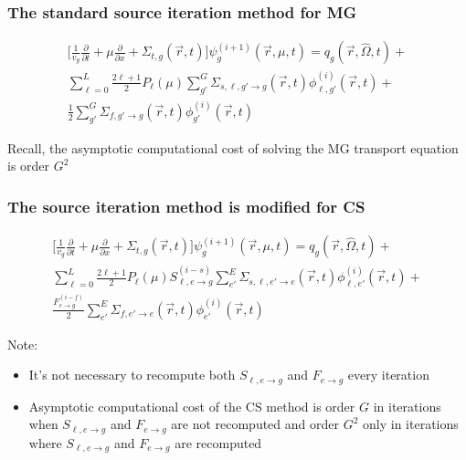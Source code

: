 \documentclass[xcolor=dvipsnames]{beamer}
\newlength{\wideitemsep}
\let\olditem\item
\renewcommand{\item}{\setlength{\itemsep}{\wideitemsep}\olditem}
\begin{document}
\begin{frame}
  \frametitle{The standard source iteration method for MG}

\begin{itemize}
\end{itemize}
\begin{multline*}
\Bigg[\frac{1}{v_g} \frac{\partial}{\partial t} + \mu \frac{\partial}{\partial x} + \Sigma_{t,g}(\vec{r},t) \Bigg] \psi^{(i+1)}_g(\vec{r},\mu,t)  = q_g(\vec{r},\hat{\Omega},t) + \\  \sum_{\ell=0}^L \frac{2 \ell + 1}{2} P_\ell(\mu) \sum_{g'}^G \Sigma_{s,\ell, g' \to g}(\vec{r},t) \phi^{(i)}_{\ell,g'}(\vec{r},t) + \\  \frac{1}{2} \sum_{g'}^G \Sigma_{f,g' \to g}(\vec{r},t) \phi^{(i)}_{g'}(\vec{r},t)
\end{multline*}

\vspace{0.5cm}

Recall, the asymptotic computational cost of solving the MG transport equation is order $G^2$

\end{frame}



\begin{frame}
  \frametitle{The source iteration method is modified for CS}

\begin{multline*}
\Bigg[\frac{1}{v_g} \frac{\partial}{\partial t} + \mu \frac{\partial}{\partial x} + \Sigma_{t,g}(\vec{r},t) \Bigg] \psi^{(i+1)}_g(\vec{r},\mu,t)  = q_g(\vec{r},\hat{\Omega},t) + \\  \sum_{\ell=0}^L \frac{2 \ell + 1}{2} P_\ell(\mu) S_{\ell,e\to g}^{(i-s)} \sum_{e'}^E \Sigma_{s,\ell, e' \to e}(\vec{r},t) \phi^{(i)}_{\ell,e'}(\vec{r},t) + \\  \frac{F_{e \to g}^{(i-f)}}{2} \sum_{e'}^E \Sigma_{f,e' \to e}(\vec{r},t) \phi^{(i)}_{e'}(\vec{r},t)
\end{multline*}

Note:
\begin{itemize}
\item It's not necessary to recompute both $S_{\ell,e\to g}$ and $F_{e \to g}$ every iteration
\item Asymptotic computational cost of the CS method is order $G$ in iterations when $S_{\ell,e\to g}$ and $F_{e \to g}$ are not recomputed and order $G^2$ only in iterations where $S_{\ell,e\to g}$ and $F_{e \to g}$ are recomputed
\end{itemize}

\end{frame}
\end{document}
